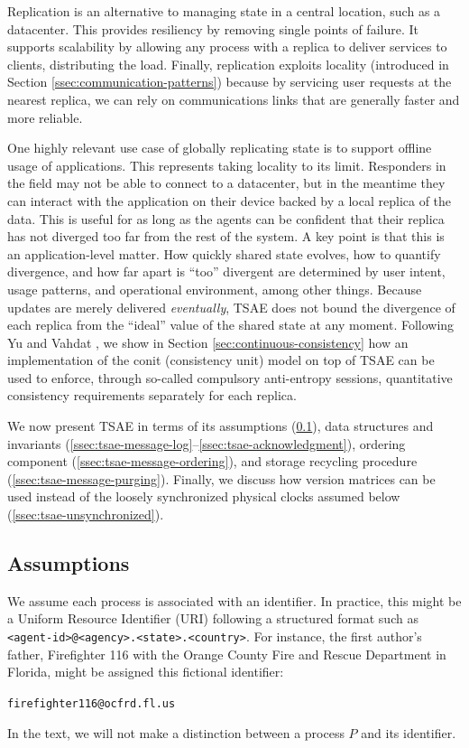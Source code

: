 \documentclass[]             %
{NASA}                       %
\theoremstyle{definition}
\begin{document}

Replication is an alternative to managing state in a central location,
such as a datacenter. This provides resiliency by removing single
points of failure. It supports scalability by allowing any process
with a replica to deliver services to clients, distributing the
load. Finally, replication exploits locality (introduced in Section
\ref{ssec:communication-patterns}) because by servicing user requests
at the nearest replica, we can rely on communications links that are
generally faster and more reliable.

One highly relevant use case of globally replicating state is to
support offline usage of applications. This represents taking locality
to its limit. Responders in the field may not be able to connect to a
datacenter, but in the meantime they can interact with the application
on their device backed by a local replica of the data. This is useful
for as long as the agents can be confident that their replica has not
diverged too far from the rest of the system. A key point is that this
is an application-level matter. How quickly shared state evolves, how
to quantify divergence, and how far apart is ``too'' divergent are
determined by user intent, usage patterns, and operational
environment, among other things. Because updates are merely delivered
\emph{eventually}, TSAE does not bound the divergence of each replica
from the ``ideal'' value of the shared state at any moment. Following Yu
and Vahdat \cite{2002tact}, we show in Section
\ref{sec:continuous-consistency} how an implementation of the conit
(consistency unit) model on top of TSAE can be used to enforce,
through so-called compulsory anti-entropy sessions, quantitative
consistency requirements separately for each replica.

We now present TSAE in terms of its assumptions
(\ref{ssec:tsae-assumptions}), data structures and invariants
(\ref{ssec:tsae-message-log}--\ref{ssec:tsae-acknowledgment}),
ordering component (\ref{ssec:tsae-message-ordering}), and storage
recycling procedure (\ref{ssec:tsae-message-purging}). Finally, we
discuss how version matrices can be used instead of the loosely
synchronized physical clocks assumed below
(\ref{ssec:tsae-unsynchronized}).

\subsection{Assumptions}
\label{ssec:tsae-assumptions}
We assume each process is associated with an identifier. In practice,
this might be a Uniform Resource Identifier (URI) \cite{rfc3986}
following a structured format such as
\texttt{<agent-id>@<agency>.<state>.<country>}. For instance, the first author's father, Firefighter 116 with the Orange County Fire and Rescue Department in Florida, might be assigned this fictional identifier:
\begin{center}
  \texttt{firefighter116@ocfrd.fl.us}
\end{center}
In the text, we will not make a distinction between a process $P$ and its
identifier.
\end{document}

